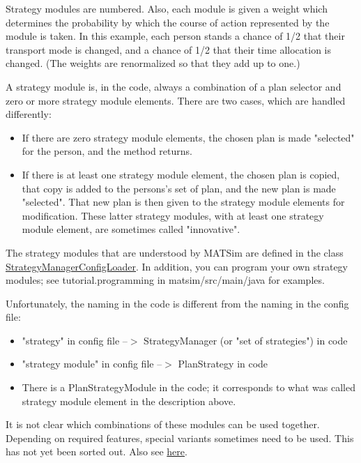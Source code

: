 \documentclass[a4paper,11pt]{report}
\begin{document}
Strategy modules are numbered. Also, each  module is given a weight which determines the probability by which the  course of action represented by the module is taken. In this example,  each person stands a chance of 1/2 that their transport mode is changed,  and a chance of 1/2 that their time allocation is changed. (The  weights are renormalized so that they add up to one.)

A strategy module is, in the code, always a combination of a plan  selector and zero or more strategy module elements. There are two cases,  which are handled differently:
\begin{itemize}
	\item If there are zero strategy module elements, the chosen plan is made "selected" for the person, and the method returns.
	\item If there is at least one strategy module element, the chosen plan is  copied, that copy is added to the persons's set of plan, and the new  plan is made "selected". That new plan is then given to the  strategy module elements for modification. These latter strategy  modules, with at least one strategy module element, are sometimes called  "innovative".
\end{itemize}

The strategy modules that are understood by MATSim are defined in the class \href{http://www.matsim.org/xref/org/matsim/core/replanning/StrategyManagerConfigLoader.html}{StrategyManagerConfigLoader}. In addition, you can program your own strategy modules; see tutorial.programming in matsim/src/main/java for examples.

Unfortunately, the naming in the code is different from the naming in the config file:
\begin{itemize}
	\item "strategy" in config file --$>$ StrategyManager (or "set of strategies") in code
	\item "strategy module" in config file --$>$ PlanStrategy in code
	\item There is a PlanStrategyModule in the code; it corresponds to what was called strategy module element in the description above.
\end{itemize}

It is not clear which combinations of these modules can be used  together. Depending on required features, special variants sometimes  need to be used. This has not yet been sorted out. Also see \href{http://matsim.org/node/690}{here}.


\vfill\eject
\end{document}
